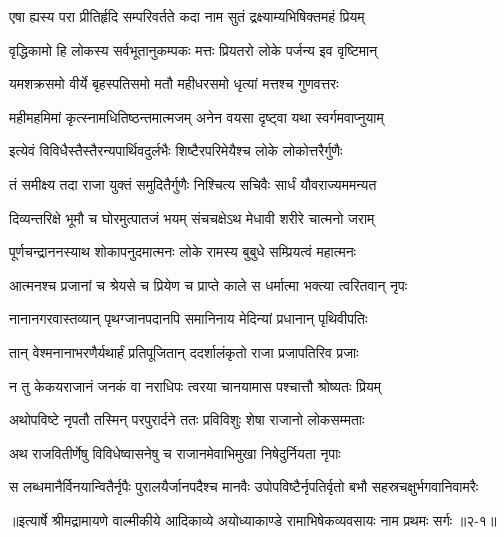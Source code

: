 \twolineshloka
{एषा ह्यस्य परा प्रीतिर्हृदि सम्परिवर्तते}
{कदा नाम सुतं द्रक्ष्याम्यभिषिक्तमहं प्रियम्} %

\twolineshloka
{वृद्धिकामो हि लोकस्य सर्वभूतानुकम्पकः}
{मत्तः प्रियतरो लोके पर्जन्य इव वृष्टिमान्} %

\twolineshloka
{यमशक्रसमो वीर्ये बृहस्पतिसमो मतौ}
{महीधरसमो धृत्यां मत्तश्च गुणवत्तरः} %

\twolineshloka
{महीमहमिमां कृत्स्नामधितिष्ठन्तमात्मजम्}
{अनेन वयसा दृष्ट्वा यथा स्वर्गमवाप्नुयाम्} %

\twolineshloka
{इत्येवं विविधैस्तैस्तैरन्यपार्थिवदुर्लभैः}
{शिष्टैरपरिमेयैश्च लोके लोकोत्तरैर्गुणैः} %

\twolineshloka
{तं समीक्ष्य तदा राजा युक्तं समुदितैर्गुणैः}
{निश्चित्य सचिवैः सार्धं यौवराज्यममन्यत} %

\twolineshloka
{दिव्यन्तरिक्षे भूमौ च घोरमुत्पातजं भयम्}
{संचचक्षेऽथ मेधावी शरीरे चात्मनो जराम्} %

\twolineshloka
{पूर्णचन्द्राननस्याथ शोकापनुदमात्मनः}
{लोके रामस्य बुबुधे सम्प्रियत्वं महात्मनः} %

\twolineshloka
{आत्मनश्च प्रजानां च श्रेयसे च प्रियेण च}
{प्राप्ते काले स धर्मात्मा भक्त्या त्वरितवान् नृपः} %

\twolineshloka
{नानानगरवास्तव्यान् पृथग्जानपदानपि}
{समानिनाय मेदिन्यां प्रधानान् पृथिवीपतिः} %

\twolineshloka
{तान् वेश्मनानाभरणैर्यथार्हं प्रतिपूजितान्}
{ददर्शालंकृतो राजा प्रजापतिरिव प्रजाः} %

\twolineshloka
{न तु केकयराजानं जनकं वा नराधिपः}
{त्वरया चानयामास पश्चात्तौ श्रोष्यतः प्रियम्} %

\twolineshloka
{अथोपविष्टे नृपतौ तस्मिन् परपुरार्दने}
{ततः प्रविविशुः शेषा राजानो लोकसम्मताः} %

\twolineshloka
{अथ राजवितीर्णेषु विविधेष्वासनेषु च}
{राजानमेवाभिमुखा निषेदुर्नियता नृपाः} %

\twolineshloka
{स लब्धमानैर्विनयान्वितैर्नृपैः पुरालयैर्जानपदैश्च मानवैः}
{उपोपविष्टैर्नृपतिर्वृतो बभौ सहस्रचक्षुर्भगवानिवामरैः} %


॥इत्यार्षे श्रीमद्रामायणे वाल्मीकीये आदिकाव्ये अयोध्याकाण्डे रामाभिषेकव्यवसायः नाम प्रथमः सर्गः ॥२-१॥
